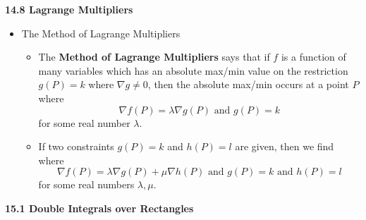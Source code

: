 \begin{itemize}
  
  
\end{itemize}
  
  \newpage
  
  \centerline{\bf 14.8 Lagrange Multipliers}
  
  \begin{itemize}
  
  \item The Method of Lagrange Multipliers
  
    \begin{itemize}
    \item 
      The \textbf{Method of Lagrange Multipliers} says that if $f$ is a function of many variables which has an absolute max/min value on the restriction $g(P)=k$ where $\nabla g \not= 0$, then the absolute max/min occurs at a point $P$ where 
      \[
        \nabla f(P)=\lambda \nabla g(P) \text{ and } g(P)=k
      \] 
      for some real number $\lambda$.

    \item 
      If two constraints $g(P)=k$ and $h(P)=l$ are given, then we find where
      \[
        \nabla f(P)=\lambda \nabla g(P) + \mu \nabla h(P) \text{ and } g(P)=k \text{ and } h(P)=l
      \]
      for some real numbers $\lambda,\mu$.

    \end{itemize}
    
  
    
  \end{itemize}
  
  \newpage
  
\centerline{\bf 15.1 Double Integrals over Rectangles}
  
